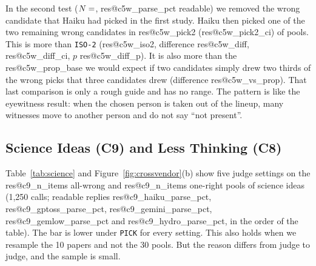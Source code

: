 \documentclass[10pt,twocolumn]{article}
\makeatletter
\newcommand{\res}[1]{\csname res@#1\endcsname}
\makeatother
\begin{document}
In the second test ($N=\res{c5w_n}$, \res{c5w_parse_pct} readable) we removed the wrong candidate that Haiku had picked in the first study. Haiku then picked one of the two remaining wrong candidates in \res{c5w_pick2} (\res{c5w_pick2_ci}) of pools. This is more than \texttt{ISO-2} (\res{c5w_iso2}, difference \res{c5w_diff}, \res{c5w_diff_ci}, $p$ \res{c5w_diff_p}). It is also more than the \res{c5w_prop_base} we would expect if two candidates simply drew two thirds of the wrong picks that three candidates drew (difference \res{c5w_vs_prop}). That last comparison is only a rough guide and has no range. The pattern is like the eyewitness result: when the chosen person is taken out of the lineup, many witnesses move to another person and do not say ``not present''.

\subsection{Science Ideas (C9) and Less Thinking (C8)}
Table~\ref{tab:science} and Figure~\ref{fig:crossvendor}(b) show five judge settings on the \res{c9_n_items} all-wrong and \res{c9_n_items} one-right pools of science ideas (1,250 calls; readable replies \res{c9_haiku_parse_pct}, \res{c9_gptoss_parse_pct}, \res{c9_gemini_parse_pct}, \res{c9_gemlow_parse_pct} and \res{c9_hydro_parse_pct}, in the order of the table). The bar is lower under \texttt{PICK} for every setting. This also holds when we resample the 10 papers and not the 30 pools. But the reason differs from judge to judge, and the sample is small.
\end{document}
